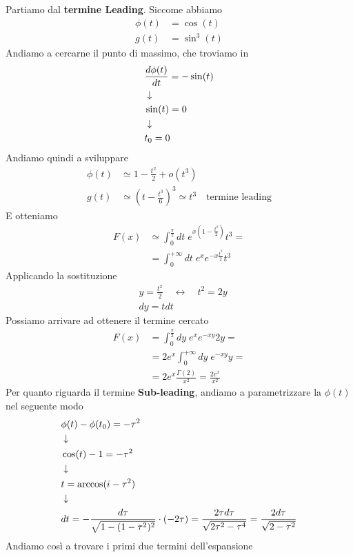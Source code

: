 Partiamo dal \textbf{termine Leading}. Siccome abbiamo
\begin{align}
	\phi(t) &= \cos(t) \\
	g(t) &= \sin^3(t)
\end{align}
Andiamo a cercarne il punto di massimo, che troviamo in
\begin{align}
	&\frac{d \phi(t)}{dt} = -\sin(t) \\ &\downarrow \nonumber \\
	&\sin(t) = 0 \nonumber \\ &\downarrow \nonumber \\
	&t_0=0
\end{align}
Andiamo quindi a sviluppare
\begin{align}
	\phi(t) &\simeq 1- \frac{t^2}{2} + o(t^3)  \\
	g(t) &\simeq \left( t - \frac{t^3}{6} \right)^3 \simeq t^3 \quad \text{termine leading}
\end{align}
E otteniamo
\begin{align}
	F(x) &\simeq \int_{0}^{\frac{\pi}{2}} dt \; e^{x\left(1- \frac{t^2}{2}\right)}t^3 = \nonumber\\
	&= \int_{0}^{+\infty} dt \; e^x e^{-x\frac{t^2}{2}}t^3
\end{align}
Applicando la sostituzione
\begin{align}
	&y= \frac{t^2}{2} \quad \leftrightarrow \quad t^2 = 2y \\
	&dy = tdt
\end{align}
Possiamo arrivare ad ottenere il termine cercato
\begin{align}
	F(x) &= \int_{0}^{\frac{\pi}{2}} dy \; e^x e^{-xy}2y = \nonumber\\
	&= 2e^x\int_{0}^{+\infty} dy \;e^{-xy}y = \nonumber\\
	&= 2e^x \frac{\Gamma(2)}{x^2} = \frac{2e^x}{x^2}
\end{align}
\newpage
Per quanto riguarda il termine \textbf{Sub-leading}, andiamo a parametrizzare la $\phi(t)$ nel seguente modo
\begin{align}
	&\phi(t) - \phi(t_0) = -\tau^2 \\ &\downarrow \nonumber \\
	&\cos(t) - 1 = -\tau^2 \nonumber \\ &\downarrow \nonumber \\
	&t= \arccos(i-\tau^2) \\ &\downarrow \nonumber \\
	&dt = -\frac{d\tau}{\sqrt{1-(1-\tau^2)^2}}\cdot(-2\tau) = \frac{2\tau d\tau}{\sqrt{2\tau^2-\tau^4}} = \frac{2d\tau}{\sqrt{2-\tau^2}}
\end{align}
Andiamo così a trovare i primi due termini dell'espansione

